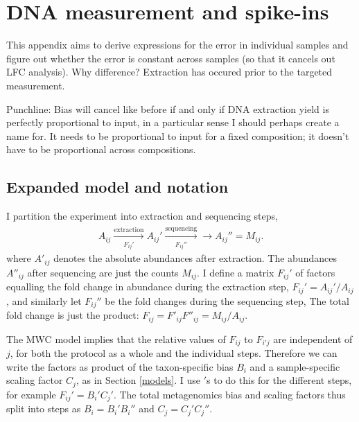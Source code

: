 \documentclass[
]{article}
\theoremstyle{definition}
\theoremstyle{definition}
\theoremstyle{definition}
\theoremstyle{definition}
\theoremstyle{remark}
\begin{document}
\hypertarget{dna-measurement-and-spike-ins}{%
\section{DNA measurement and spike-ins}\label{dna-measurement-and-spike-ins}}

This appendix aims to derive expressions for the error in individual samples and figure out whether the error is constant across samples (so that it cancels out LFC analysis).
Why difference? Extraction has occured prior to the targeted measurement.

Punchline: Bias will cancel like before if and only if DNA extraction yield is perfectly proportional to input, in a particular sense I should perhaps create a name for.
It needs to be proportional to input for a fixed composition; it doesn't have to be proportional across compositions.

\hypertarget{expanded-model-and-notation}{%
\subsection{Expanded model and notation}\label{expanded-model-and-notation}}

I partition the experiment into extraction and sequencing steps,
\begin{align}
  A_{ij} 
  \overset{\text{extraction}}{\underset{F_{ij}'}\longrightarrow}
  A_{ij}'
  \overset{\text{sequencing}}{\underset{F_{ij}''}\longrightarrow}
  \to A_{ij}'' = M_{ij}.
\end{align}
where \(A'_{ij}\) denotes the absolute abundances after extraction.
The abundances \(A''_{ij}\) after sequencing are just the counts \(M_{ij}\).
I define a matrix \(F_{ij}'\) of factors equalling the fold change in abundance during the extraction step, \(F_{ij}' = A_{ij}' / A_{ij}\), and similarly let \(F_{ij}''\) be the fold changes during the sequencing step,
The total fold change is just the product: \(F_{ij} = F'_{ij} F''_{ij} = M_{ij} / A_{ij}\).

The MWC model implies that the relative values of \(F_{ij}\) to \(F_{i'j}\) are independent of \(j\), for both the protocol as a whole and the individual steps.
Therefore we can write the factors as product of the taxon-specific bias \(B_i\) and a sample-specific scaling factor \(C_j\), as in Section \ref{models}.
I use \('\)s to do this for the different steps, for example \(F_{ij}' = B_i' C_j'\).
The total metagenomics bias and scaling factors thus split into steps as \(B_i = B_i' B_i''\) and \(C_j = C_j' C_j''\).
\end{document}
